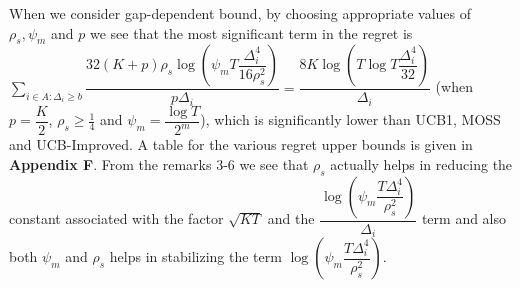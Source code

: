 \begin{remark}
	When we consider gap-dependent bound, by choosing appropriate values of $\rho_{s},\psi_{m}$ and $p$ we see that the most significant term in the regret is $\sum_{i\in A:\Delta_{i}\geq b}\dfrac{32(K+p)\rho_{s}\log{(\psi_{m}T\dfrac{\Delta_{i}^{4}}{16\rho_{s}^{2}})}}{p\Delta_{i}}= \dfrac{8K\log{(T\log T\dfrac{\Delta_{i}^{4}}{32})}}{\Delta_{i}}$ (when $p= \dfrac{K}{2}$, $\rho_{s} \geq \frac{1}{4}$ and $\psi_{m}=\dfrac{\log T}{2^{m}}$), which is significantly lower than UCB1, MOSS and UCB-Improved. A table for the various regret upper bounds is given in \textbf{Appendix F}. From the remarks $3$-$6$ we see that $\rho_{s}$ actually helps in reducing the constant associated with the factor $\sqrt{KT}$ and the $\dfrac{\log(\psi_{m}\dfrac{T\Delta_{i}^{4}}{\rho_{s}^{2}})}{\Delta_{i}}$ term and also both $\psi_{m}$ and $\rho_{s}$ helps in stabilizing the term $\log(\psi_{m}\dfrac{T\Delta_{i}^{4}}{\rho_{s}^{2}})$.
	
\end{remark}	



